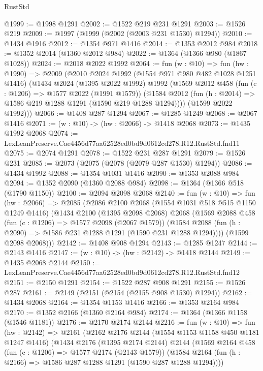 \begin{lexlean}{RustStd}
\begin{coremodule}
@1999 := @1998 @1291
@2002 := @1522 @219 @231 @1291
@2003 := @1526 @219
@2009 := @1997 (@1999 (@2002 (@2003 @231 @1530) @1294))
@2010 := @1434 @1916
@2012 := @1354 @971 @1416
@2014 := @1353 @2012 @984
@2018 := @1352 @2014 (@1360 @2012 @984)
@2022 := @1364 (@1366 @980 (@1867 @1028))
@2024 := @2018 @2022 @1992
@2064 := fun (w : @10) =>
  fun (hw : @1990) =>
  @2009
    (@2010
      @2024
      @1992
      (@1554 @971 @980 @482 @1028 @1251 @1416)
      (@1434
        @2024
        (@1395 @2022 @1992)
        @1992
        (@1569
          @2012
          @458
          (fun (c : @1206) => @1577 @2022 (@1991 @1579))
          (@1584 @2012 (fun (h : @2014) => @1586 @219 @1288 @1291 (@1590 @219 @1288 @1294))))
        (@1599 @2022 @1992)))
@2066 := @1408 @287 @1294
@2067 := @1285 @1249
@2068 := @2067 @1416
@2071 := (w : @10) -> (hw : @2066) -> @1418 @2068
@2073 := @1435 @1992 @2068
@2074 := LexLeanPreserve.Cae4456d77aa62528ed0bd9d0612cd278.R12.RustStd.fnd11
@2075 := @2074 @1291
@2078 := @1522 @231 @287 @1291
@2079 := @1526 @231
@2085 := @2073 (@2075 (@2078 (@2079 @287 @1530) @1294))
@2086 := @1434 @1992
@2088 := @1354 @1031 @1416
@2090 := @1353 @2088 @984
@2094 := @1352 @2090 (@1360 @2088 @984)
@2098 := @1364 (@1366 @518 (@1790 @1150))
@2100 := @2094 @2098 @2068
@2140 := fun (w : @10) =>
  fun (hw : @2066) =>
  @2085
    (@2086
      @2100
      @2068
      (@1554 @1031 @518 @515 @1150 @1249 @1416)
      (@1434
        @2100
        (@1395 @2098 @2068)
        @2068
        (@1569
          @2088
          @458
          (fun (c : @1206) => @1577 @2098 (@2067 @1579))
          (@1584 @2088 (fun (h : @2090) => @1586 @231 @1288 @1291 (@1590 @231 @1288 @1294))))
        (@1599 @2098 @2068)))
@2142 := @1408 @908 @1294
@2143 := @1285 @1247
@2144 := @2143 @1416
@2147 := (w : @10) -> (hw : @2142) -> @1418 @2144
@2149 := @1435 @2068 @2144
@2150 := LexLeanPreserve.Cae4456d77aa62528ed0bd9d0612cd278.R12.RustStd.fnd12
@2151 := @2150 @1291
@2154 := @1522 @287 @908 @1291
@2155 := @1526 @287
@2161 := @2149 (@2151 (@2154 (@2155 @908 @1530) @1294))
@2162 := @1434 @2068
@2164 := @1354 @1153 @1416
@2166 := @1353 @2164 @984
@2170 := @1352 @2166 (@1360 @2164 @984)
@2174 := @1364 (@1366 @1158 (@1546 @1181))
@2176 := @2170 @2174 @2144
@2216 := fun (w : @10) =>
  fun (hw : @2142) =>
  @2161
    (@2162
      @2176
      @2144
      (@1554 @1153 @1158 @450 @1181 @1247 @1416)
      (@1434
        @2176
        (@1395 @2174 @2144)
        @2144
        (@1569
          @2164
          @458
          (fun (c : @1206) => @1577 @2174 (@2143 @1579))
          (@1584 @2164 (fun (h : @2166) => @1586 @287 @1288 @1291 (@1590 @287 @1288 @1294))))

\end{coremodule}
\end{lexlean}
